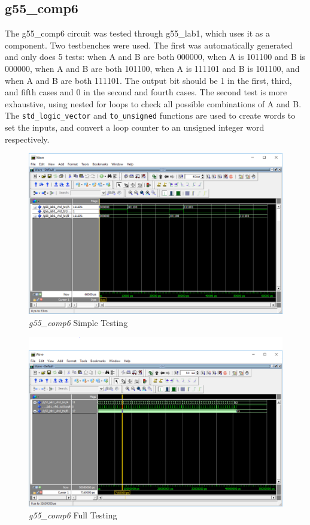 \documentclass[12pt]{article}
\begin{document}
\subsection{g55\_comp6}
The g55\_comp6 circuit was tested through g55\_lab1, which uses it as a component. Two testbenches were used. The first was automatically generated and only does 5 tests: when A and B are both 000000, when A is 101100 and B is 000000, when A and B are both 101100, when A is 111101 and B is 101100, and when A and B are both 111101. The output bit should be 1 in the first, third, and fifth cases and 0 in the second and fourth cases. The second test is more exhaustive, using nested for loops to check all possible combinations of A and B. The \texttt{std\_logic\_vector} and \texttt{to\_unsigned} functions are used to create words to set the inputs, and convert a loop counter to an unsigned integer word respectively.

\begin{figure}[h!t]
\centering
\includegraphics[scale=0.3]{graphics/comp6_wave.png}
\caption{\textit{g55\_comp6} Simple Testing}
\end{figure}
\begin{figure}[h!b]
\centering
\includegraphics[scale=0.3]{graphics/comp6_wave_full.png}
\caption{\textit{g55\_comp6} Full Testing}
\end{figure}
\end{document}
